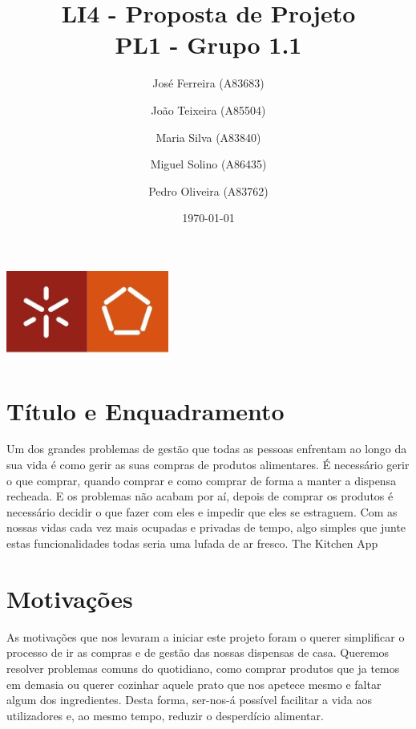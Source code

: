 \documentclass[a4paper]{report}
\begin{document}
\title{LI4 - Proposta de Projeto\\ 
\large PL1 - Grupo 1.1}
\author{José Ferreira (A83683) \and João Teixeira (A85504) \and Maria Silva
(A83840) \and Miguel Solino (A86435) \and Pedro Oliveira (A83762)}
\date{\today}

\begin{center}
    \begin{minipage}{0.75\linewidth}
        \centering
        \includegraphics[width=0.4\textwidth]{images/eng.jpeg}\par\vspace{1cm}
        \vspace{1.5cm}
        \href{https://www.uminho.pt/PT}
        {\color{black}{\scshape\LARGE Universidade do Minho}} \par
        \vspace{1cm}
        \href{https://www.di.uminho.pt/}
        {\color{black}{\scshape\Large Departamento de Informática}} \par
        \vspace{1.5cm}
        \maketitle
    \end{minipage}
\end{center}

\pagebreak
\section{Título e Enquadramento}
Um dos grandes problemas de gestão que todas as pessoas enfrentam ao longo da
sua vida é como gerir as suas compras de produtos alimentares. É necessário
gerir o que comprar, quando comprar e como comprar de forma a manter a dispensa
recheada. E os problemas não acabam por aí, depois de comprar os produtos é
necessário decidir o que fazer com eles e impedir que eles se estraguem. Com as
nossas vidas cada vez mais ocupadas e privadas de tempo, algo simples que junte
estas funcionalidades todas seria uma lufada de ar fresco.
The Kitchen App

\section{Motivações}
As motivações que nos levaram a iniciar este projeto foram o querer simplificar
o processo de ir as compras e de gestão das nossas dispensas de casa.
Queremos resolver problemas comuns do quotidiano, como comprar produtos que 
ja temos em demasia ou querer cozinhar aquele prato
que nos apetece mesmo e faltar algum dos ingredientes. 
Desta forma, ser-nos-á possível facilitar a vida aos utilizadores e, 
ao mesmo tempo, reduzir o desperdício alimentar.
\end{document}
